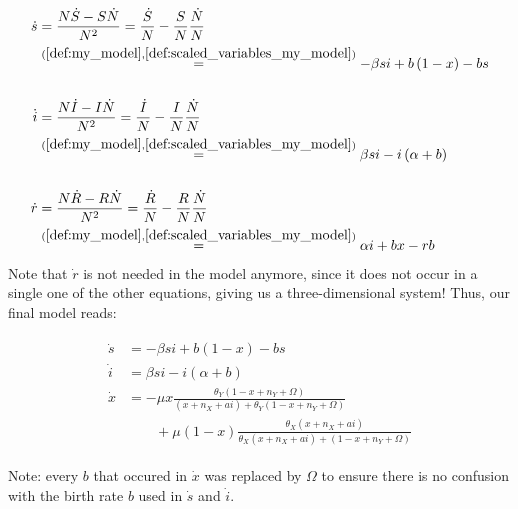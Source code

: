 \begin{align*}
\dot{s} &= \frac{N\dot{S}-S\dot{N}}{N^2} = \frac{\dot{S}}{N} - \frac{S}{N}\frac{\dot{N}}{N}\\
&\overset{(\ref{def:my_model}, \ref{def:scaled_variables_my_model})}{=} -\beta si + b\left(1-x\right) - bs\\
&\\
\dot{i} &= \frac{N\dot{I}-I\dot{N}}{N^2} = \frac{\dot{I}}{N} - \frac{I}{N}\frac{\dot{N}}{N}\\
&\overset{(\ref{def:my_model}, \ref{def:scaled_variables_my_model})}{=} \beta si - i\left(\alpha + b\right)\\
&\\
\dot{r} &= \frac{N\dot{R}-R\dot{N}}{N^2} = \frac{\dot{R}}{N} - \frac{R}{N}\frac{\dot{N}}{N}\\
&\overset{(\ref{def:my_model}, \ref{def:scaled_variables_my_model})}{=} \alpha i + bx - rb
\end{align*}
Note that $\dot{r}$ is not needed in the model anymore, since it does not occur in a single one of the other equations, giving us a three-dimensional system! Thus, our final model reads:
\begin{model}[My model V1]
	\begin{align}
		\begin{split}
			\dot{s} &= -\beta si + b\left(1-x\right) - bs\\
			\dot{i} &= \beta si - i\left(\alpha + b\right)\\
			\dot{x} &= -\mu x\frac{\theta_Y(1-x+n_Y+\Omega)}{(x+n_X+ai) + \theta_Y(1-x+n_Y+\Omega)}\\
			&\qquad+ \mu \left(1-x\right)\frac{\theta_X (x+ n_X+ ai)}{\theta_X (x + n_X + ai) + (1-x + n_Y + \Omega)}
		\end{split}
	\end{align}
\end{model}

Note: every $b$ that occured in $\dot{x}$ was replaced by $\Omega$ to ensure there is no confusion with the birth rate $b$ used in $\dot{s}$ and $\dot{i}$.